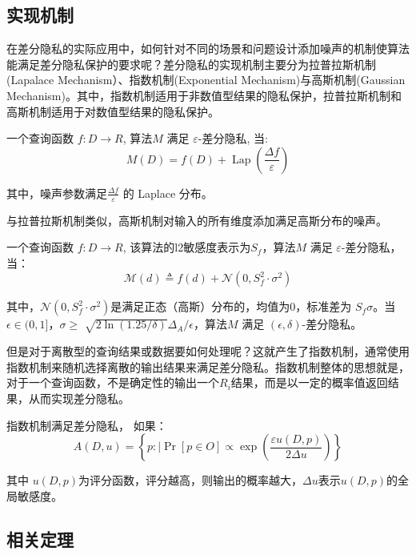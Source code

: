 \subsection{实现机制}
在差分隐私的实际应用中，如何针对不同的场景和问题设计添加噪声的机制使算法能满足差分隐私保护的要求呢？差分隐私的实现机制主要分为拉普拉斯机制(Lapalace Mechanism）、指数机制(Exponential Mechanism)与高斯机制(Gaussian Mechanism)。其中，指数机制适用于非数值型结果的隐私保护，拉普拉斯机制和高斯机制适用于对数值型结果的隐私保护。

\begin{theorem}[拉普拉斯机制]\label{拉普拉斯机制}
一个查询函数 $f: D \rightarrow R$, 算法$M$ 满足 $\varepsilon$-差分隐私, 当:
$$
M(D)=f(D)+\operatorname{Lap}\left(\frac{\Delta f}{\varepsilon}\right)
$$
\end{theorem}
其中，噪声参数满足$\frac{\Delta f}{\varepsilon}$ 的 Laplace 分布。

与拉普拉斯机制类似，高斯机制对输入的所有维度添加满足高斯分布的噪声。
\begin{theorem}[高斯机制]\label{高斯机制}
一个查询函数 $f: D \rightarrow R$, 该算法的l2敏感度表示为$S_{f}$，算法$M$ 满足 $\varepsilon$-差分隐私，当：
$$
\mathcal{M}(d) \triangleq f(d)+\mathcal{N}\left(0, S_{f}^{2} \cdot \sigma^{2}\right)
$$
\end{theorem}
其中，$\mathcal{N}\left(0, S_{f}^{2} \cdot \sigma^{2}\right)$是满足正态（高斯）分布的，均值为0，标准差为 $S_{f} \sigma$。当$\epsilon \in(0,1]$，$\sigma \geq$ $\sqrt{2 \ln (1.25 / \delta)} \Delta_{A} / \epsilon$，算法$M$ 满足 $(\epsilon, \delta)$-差分隐私。

但是对于离散型的查询结果或数据要如何处理呢？这就产生了指数机制，通常使用指数机制来随机选择离散的输出结果来满足差分隐私。指数机制整体的思想就是，对于一个查询函数，不是确定性的输出一个$R_{i}$结果，而是以一定的概率值返回结果，从而实现差分隐私。

\begin{theorem}[指数机制]\label{指数机制}
指数机制满足差分隐私， 如果：
$$
A(D,u)=\left\{p: \mid \operatorname{Pr}[p \in O] \propto \exp \left(\frac{\varepsilon u(D,p)}{2 \Delta u}\right)\right\}
$$
\end{theorem}
其中 $u(D,p)$为评分函数，评分越高，则输出的概率越大，$\Delta u$表示$u(D,p)$的全局敏感度。

\subsection{相关定理}

